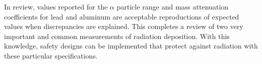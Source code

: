 In review, values reported for the $\alpha$ particle range and mass attenuation coefficients for lead and aluminum are acceptable reproductions of expected values when discrepancies are explained. This completes a review of two very important and common measurements of radiation deposition. With this knowledge, safety designs can be implemented that protect against radiation with these particular specifications.
